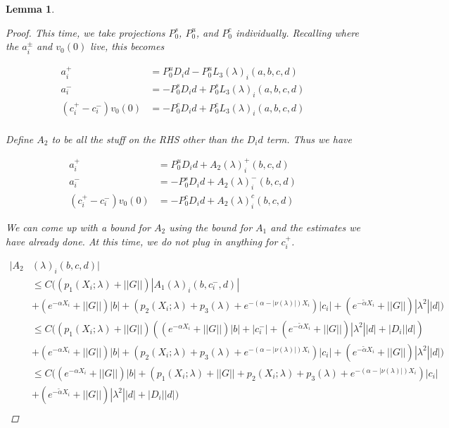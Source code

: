 \documentclass[12pt]{article}
\newtheorem{lemma}{Lemma}
\begin{document}
\begin{lemma}
\begin{proof}
This time, we take projections $P^s_0$, $P^u_0$, and $P^c_0$ individually. Recalling where the $a_i^\pm$ and $v_0(0)$ live, this becomes 

\begin{align*}
a_i^+ &= P^u_0 D_i d - P^u_0 L_3(\lambda)_i(a, b, c, d) \\
a_i^- &= -P^s_0 D_i d + P^s_0 L_3(\lambda)_i(a, b, c, d) \\
(c_i^+ - c_i^-)v_0(0) &= -P^c_0 D_i d + P^c_0 L_3(\lambda)_i(a, b, c, d) \\
\end{align*}

Define $A_2$ to be all the stuff on the RHS other than the $D_i d$ term. Thus we have 

\begin{align*}
a_i^+ &= P^u_0 D_i d + A_2(\lambda)_i^+(b, c, d) \\
a_i^- &= -P^s_0 D_i d + A_2(\lambda)_i^-(b, c, d) \\
(c_i^+ - c_i^-)v_0(0) &= -P^c_0 D_i d + A_2(\lambda)_i^c(b, c, d)
\end{align*}

We can come up with a bound for $A_2$ using the bound for $A_1$ and the estimates we have already done. At this time, we do not plug in anything for $c_i^+$.

\begin{align*}
|A_2&(\lambda)_i(b, c, d)| \\
&\leq C \Big( (p_1(X_i; \lambda) + ||G|| )|A_1(\lambda)_i(b, c_i^-, d)| \\
&+ (e^{-\alpha X_i} + ||G||)|b| + (p_2(X_i; \lambda) + p_3(\lambda) + e^{-(\alpha - |\nu(\lambda)|)X_i})|c_i| + (e^{-\tilde{\alpha} X_i} + ||G||) |\lambda^2| |d| \Big) \\
&\leq C \Big( (p_1(X_i; \lambda) + ||G|| )( (e^{-\alpha X_i} + ||G||) |b| + |c_i^-|
+ (e^{-\tilde{\alpha} X_i} + ||G||) |\lambda^2| |d| + |D_i||d| ) \\
&+ (e^{-\alpha X_i} + ||G||)|b| + (p_2(X_i; \lambda) + p_3(\lambda) + e^{-(\alpha - |\nu(\lambda)|)X_i})|c_i| + (e^{-\tilde{\alpha} X_i} + ||G||) |\lambda^2| |d| \Big) \\
&\leq C \Big( (e^{-\alpha X_i} + ||G||)|b| + (p_1(X_i; \lambda) + ||G|| + p_2(X_i; \lambda) + p_3(\lambda) + e^{-(\alpha - |\nu(\lambda)|)X_i})|c_i| \\
&+ (e^{-\tilde{\alpha} X_i} + ||G||) |\lambda^2| |d| + |D_i||d|\Big) \\
\end{align*}

\end{proof}
\end{lemma}
\end{document}
